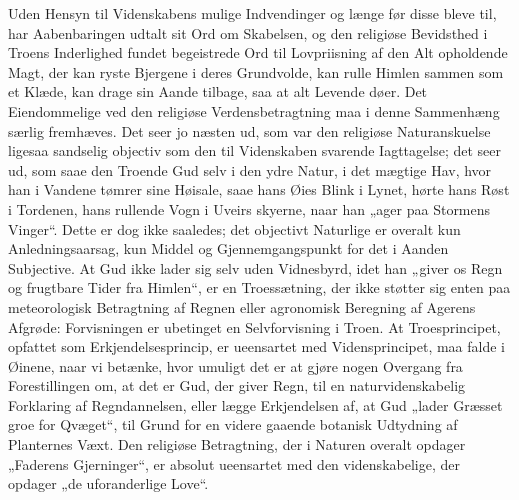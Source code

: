 \documentclass[12pt]{book}
\begin{document}
Uden Hensyn til Videnskabens mulige Indvendinger og længe før disse
bleve til, har Aabenbaringen udtalt sit Ord om Skabelsen, og den
religiøse Bevidsthed i Troens Inderlighed fundet begeistrede Ord til
Lovpriisning af den Alt opholdende Magt, der kan ryste Bjergene i
deres Grundvolde, kan rulle Himlen sammen som et Klæde, kan drage
sin Aande tilbage, saa at alt Levende døer. Det Eiendommelige ved
den religiøse Verdensbetragtning maa i denne Sammenhæng særlig
fremhæves. Det seer jo næsten ud, som var den religiøse
Naturanskuelse ligesaa sandselig objectiv som den til Videnskaben
svarende Iagttagelse; det seer ud, som saae den Troende Gud selv i
den ydre Natur, i det mægtige Hav, hvor han i Vandene tømrer sine
Høisale, saae hans Øies Blink i Lynet, hørte hans Røst i Tordenen,
hans rullende Vogn i Uveirs\-
skyerne, naar han „ager paa Stormens Vinger“. Dette er dog ikke
saaledes; det objectivt Naturlige er overalt kun Anledningsaarsag,
kun Middel og Gjennemgangspunkt for det i Aanden Subjective. At Gud
ikke lader sig selv uden Vidnesbyrd, idet han „giver os Regn og
frugtbare Tider fra Himlen“, er en Troessætning, der ikke støtter
sig enten paa meteorologisk Betragtning af Regnen eller agronomisk
Beregning af Agerens Afgrøde: Forvisningen er ubetinget en
Selvforvisning i Troen. At Troesprincipet, opfattet som
Erkjendelsesprincip, er ueensartet med Vidensprincipet, maa falde i
Øinene, naar vi betænke, hvor umuligt det er at gjøre nogen Overgang
fra Forestillingen om, at det er Gud, der giver Regn, til en
naturvidenskabelig Forklaring af Regndannelsen, eller lægge
Erkjendelsen af, at Gud „lader Græsset groe for Qvæget“, til Grund
for en videre gaaende botanisk Udtydning af Planternes Væxt. Den
religiøse Betragtning, der i Naturen overalt opdager „Faderens
Gjerninger“, er absolut ueensartet med den videnskabelige, der
opdager „de uforanderlige Love“.
\end{document}
